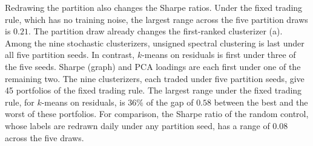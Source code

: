 Redrawing the partition also changes the Sharpe ratios. Under the fixed trading rule, which has no training noise, the largest range across the five partition draws is $0.21$. The partition draw already changes the first-ranked clusterizer (a). Among the nine stochastic clusterizers, unsigned spectral clustering is last under all five partition seeds. In contrast, $k$-means on residuals is first under three of the five seeds. Sharpe (graph) and PCA loadings are each first under one of the remaining two. The nine clusterizers, each traded under five partition seeds, give 45 portfolios of the fixed trading rule. The largest range under the fixed trading rule, for $k$-means on residuals, is $36\%$ of the gap of $0.58$ between the best and the worst of these portfolios. For comparison, the Sharpe ratio of the random control, whose labels are redrawn daily under any partition seed, has a range of $0.08$ across the five draws.

